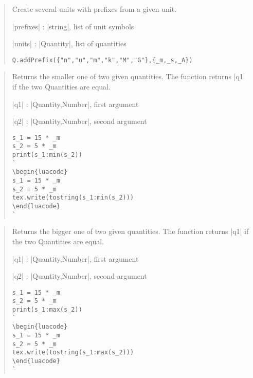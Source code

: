 \documentclass{ltxdoc}
\begin{document}
\begin{quote}
  Create several units with prefixes from a given unit.

  \begin{description}
  \item |prefixes| : |string|, list of unit symbols

  \item |units| : |Quantity|, list of quantities
  \end{description}


\begin{lstlisting}
Q.addPrefix({"n","u","m","k","M","G"},{_m,_s,_A})
\end{lstlisting}
\end{quote}



\begin{quote}
  Returns the smaller one of two given quantities. The function returns |q1| if the two Quantities are equal.

  \begin{description}
  \item |q1| : |Quantity,Number|, first argument

  \item |q2| : |Quantity,Number|, second argument
  \end{description}


\begin{lstlisting}
s_1 = 15 * _m
s_2 = 5 * _m
print(s_1:min(s_2))
`
\begin{luacode}
s_1 = 15 * _m
s_2 = 5 * _m
tex.write(tostring(s_1:min(s_2)))
\end{luacode}
`
\end{lstlisting}
\end{quote}


\begin{quote}
  Returns the bigger one of two given quantities.  The function returns |q1| if the two Quantities are equal.

  \begin{description}
  \item |q1| : |Quantity,Number|, first argument

  \item |q2| : |Quantity,Number|, second argument
  \end{description}


\begin{lstlisting}
s_1 = 15 * _m
s_2 = 5 * _m
print(s_1:max(s_2))
`
\begin{luacode}
s_1 = 15 * _m
s_2 = 5 * _m
tex.write(tostring(s_1:max(s_2)))
\end{luacode}
`
\end{lstlisting}
\end{quote}
\end{document}
